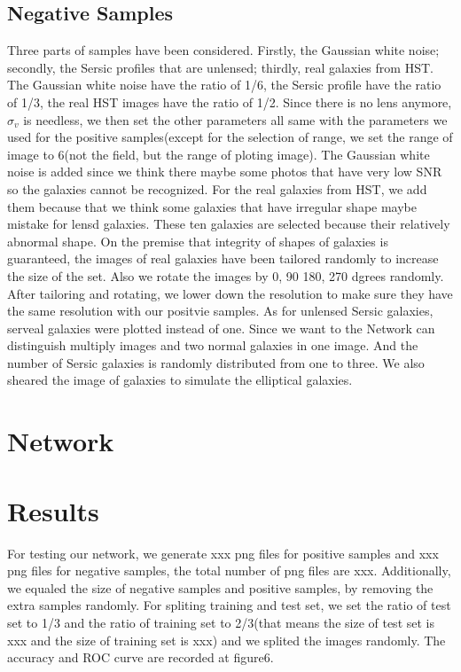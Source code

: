 \documentclass[a4paper,fleqn,usenatbib]{mnras}
\begin{document}
\subsection{Negative Samples}
Three parts of samples have been considered. Firstly, the Gaussian white noise; secondly, the Sersic profiles that are unlensed; thirdly, real galaxies from HST. The Gaussian white noise have the ratio of 1/6, the Sersic profile have the ratio of 1/3, the real HST images have the ratio of 1/2. Since there is no lens anymore, $\sigma_v$ is needless, we then set the other parameters all same with the parameters we used for the positive samples(except for the selection of range, we set the range of image to 6(not the field, but the range of ploting image). 
The Gaussian white noise is added since we think there maybe some photos that have very low SNR so the galaxies cannot be recognized. 
For the real galaxies from HST, we add them because that we think some galaxies that have irregular shape maybe mistake for lensd galaxies. These ten galaxies are selected because their relatively abnormal shape. On the premise that integrity of shapes of galaxies is guaranteed, the images of real galaxies have been tailored randomly to increase the size of the set. Also we rotate the images by 0, 90 180, 270 dgrees randomly. After tailoring and rotating, we lower down the resolution to make sure they have the same resolution with our positvie samples.
As for unlensed Sersic galaxies, serveal galaxies were plotted instead of one. Since we want to the Network can distinguish multiply images and two normal galaxies in one image. And the number of Sersic galaxies is randomly distributed from one to three. We also sheared the image of galaxies to simulate the elliptical galaxies. 
\section{Network}
\section{Results}
For testing our network, we generate xxx png files for positive samples and xxx png files for negative samples, the total number of png files are xxx. Additionally, we equaled the size of negative samples and positive samples, by removing the extra samples randomly. For spliting training and test set, we set the ratio of test set to 1/3 and the ratio of training set to 2/3(that means the size of test set is xxx and the size of training set is xxx) and we splited the images randomly. The accuracy and ROC curve are recorded at figure6.
\end{document}
